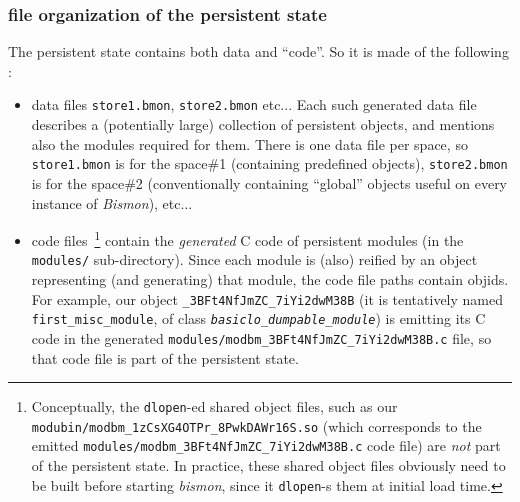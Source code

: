 \subsubsection{file organization of the persistent state}
\label{subsubsec:filestate}

The persistent state contains both data and ``code''. So it is made of the following :

\begin{itemize}
\item data files \texttt{store1.bmon}, \texttt{store2.bmon}
  etc... Each such generated data file describes a (potentially large)
  collection of persistent objects, and mentions also the modules
  required for them. There is one data file per space, so
  \texttt{store1.bmon} is for the space\#1 (containing predefined
  objects), \texttt{store2.bmon} is for the space\#2 (conventionally
  containing ``global'' objects useful on every instance of
  \emph{Bismon}), etc...

  \item code files~\footnote{Conceptually, the \texttt{dlopen}-ed
    shared object files, such as our
    \texttt{modubin/modbm\_1zCsXG4OTPr\_8PwkDAWr16S.so} (which
    corresponds to the emitted
    \texttt{modules/modbm\_3BFt4NfJmZC\_7iYi2dwM38B.c} code file) are
    \emph{not} part of the persistent state. In practice, these shared
    object files obviously need to be built before starting
    \emph{bismon}, since it \texttt{dlopen}-s them at initial load
    time.} contain the \emph{generated} C code of persistent modules
    (in the \texttt{modules/} sub-directory). Since each module is
    (also) reified by an object representing (and generating) that
    module, the code file paths contain objids. For example, our
    object \texttt{\_3BFt4NfJmZC\_7iYi2dwM38B} (it is tentatively
    named \texttt{first\_misc\_module}, of class
    \texttt{\emph{basiclo\_dumpable\_module}}) is emitting its C code
    in the generated
    {\small{\texttt{modules/modbm\_3BFt4NfJmZC\_7iYi2dwM38B.c}}} file,
    so that code file is part of the persistent state.
\end{itemize}

